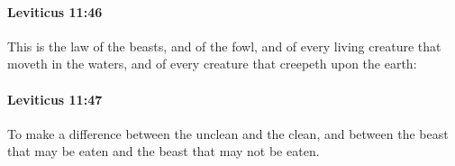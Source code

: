 		\paragraph{Leviticus 11:46} %
			\label{LEVITICUS-11-46}

			This is the law of the beasts, and of the fowl, and of every living creature that moveth in the waters, and of every creature that creepeth upon the earth:


		\paragraph{Leviticus 11:47} %
			\label{LEVITICUS-11-47}

			To make a difference between the unclean and the clean, and between the beast that may be eaten and the beast that may not be eaten.

